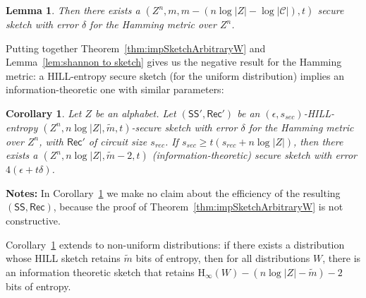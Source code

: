 \documentclass[11pt]{article}
\newcommand{\thref}[1]{\mbox{Theorem~\ref{#1}}}
\newcommand{\corref}[1]{\mbox{Corollary~\ref{#1}}}
\newcommand{\lemref}[1]{\mbox{Lemma~\ref{#1}}}
\newcommand{\class}[1]{{\ensuremath{\mathsf{#1}}}}
\newcommand{\sketch}{\ensuremath{\class{SS}}\xspace}
\newcommand{\rec}{\ensuremath{\class{Rec}}\xspace}
\newcommand{\hill}{\ensuremath{\mathtt{HILL}}\xspace}
\newcommand{\Hoo}{\mathrm{H}_\infty}
\newcommand{\Hav}{\tilde{\mathrm{H}}_\infty}
\newtheorem{lemma}[theorem]{Lemma}
\newtheorem{corollary}[theorem]{Corollary}
\newtheorem{construction}[theorem]{Construction}
\begin{document}
\begin{lemma}
Then there exists a $(Z^n, m, m-(n\log|Z|-\log |\mathcal{C}|), t)$ secure sketch with error $\delta$ for the Hamming metric over $Z^n$. 
\end{lemma}
Putting together \thref{thm:impSketchArbitraryW} and \lemref{lem:shannon to sketch} gives us the negative result for the Hamming metric: a HILL-entropy secure sketch (for the uniform distribution) implies an information-theoretic one with similar parameters:
\begin{corollary}
\label{cor:rec yields sketch}
Let $Z$ be an alphabet. Let $(\sketch', \rec')$ be an $(\epsilon,s_{sec})$-HILL-entropy $(Z^n, n\log |Z|, \tilde{m}, t)$-secure sketch with error $\delta$ for the Hamming metric over $Z^n$, with $\rec'$ of circuit size $s_{rec}$.
If $s_{sec}\geq t(s_{rec} + n\log |Z|)$, then there exists a   $(Z^n, n\log |Z|, \tilde{m}-2,t)$ (information-theoretic) secure sketch with error
$4(\epsilon+t\delta)$. 
\end{corollary}
\textbf{Notes:} In \corref{cor:rec yields sketch} we make no claim about the efficiency of the resulting  $(\sketch, \rec)$, because the proof of \thref{thm:impSketchArbitraryW} is not constructive.  

\corref{cor:rec yields sketch} extends to non-uniform distributions: if there exists a distribution whose HILL sketch retains $\tilde{m}$ bits of entropy, then for all distributions $W$, there is an information theoretic sketch that retains $\Hoo(W) - (n\log |Z|-\tilde{m})-2$ bits of entropy.
\end{document}
